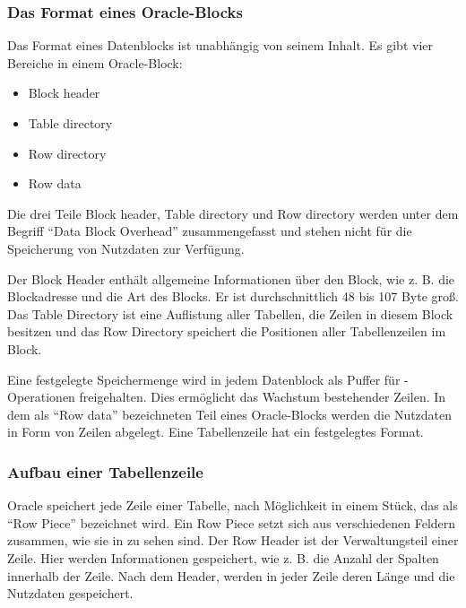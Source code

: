         \subsubsection{Das Format eines Oracle-Blocks}
          Das Format eines Datenblocks ist unabhängig von seinem Inhalt. Es gibt vier Bereiche in einem Oracle-Block:
          \begin{itemize}
            \item Block header
            \item Table directory
            \item Row directory
            \item Row data
          \end{itemize}
          Die drei Teile Block header, Table directory und Row directory werden unter dem Begriff \enquote{Data Block Overhead} zusammengefasst und stehen nicht für die Speicherung von Nutzdaten zur Verfügung.

          Der Block Header enthält allgemeine Informationen über den Block,
          wie z. B. die Blockadresse und die Art des Blocks. Er ist
          durchschnittlich 48 bis 107 Byte groß. Das Table Directory ist
          eine Auflistung aller Tabellen, die Zeilen in diesem Block besitzen
          und das Row Directory speichert die Positionen aller Tabellenzeilen im
          Block.

          Eine festgelegte Speichermenge wird in jedem Datenblock als Puffer für -Operationen freigehalten. Dies ermöglicht das Wachstum bestehender Zeilen. In dem als \enquote{Row data} bezeichneten Teil eines Oracle-Blocks werden die Nutzdaten in Form von Zeilen abgelegt. Eine Tabellenzeile hat ein festgelegtes Format.
        \subsubsection{Aufbau einer Tabellenzeile}
          Oracle speichert jede Zeile einer Tabelle, nach Möglichkeit in einem Stück, das als \enquote{Row Piece} bezeichnet wird. Ein Row Piece setzt sich aus verschiedenen Feldern zusammen, wie sie in  zu sehen sind.
          Der Row Header ist der Verwaltungsteil einer Zeile. Hier werden Informationen gespeichert, wie z. B. die Anzahl der Spalten innerhalb der Zeile. Nach dem Header, werden in jeder Zeile deren Länge und die Nutzdaten gespeichert.

